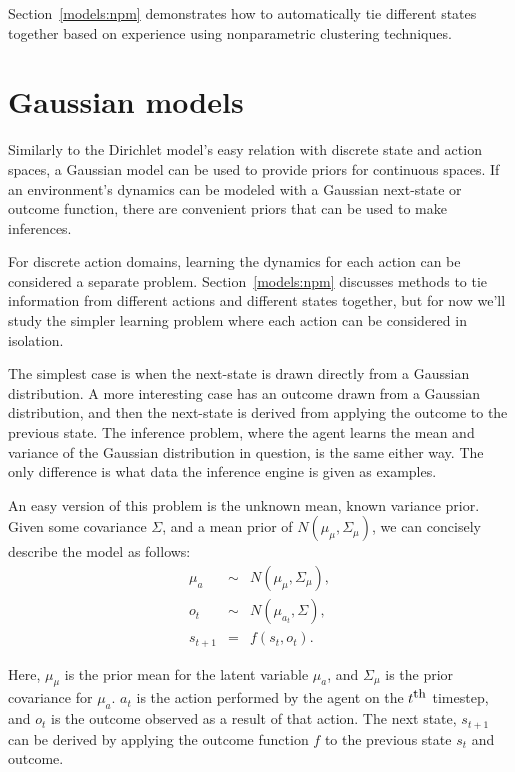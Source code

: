 Section~\ref{models:npm} demonstrates how to automatically tie different states together based on experience using nonparametric clustering techniques.

\section{Gaussian models}

Similarly to the Dirichlet model's easy relation with discrete state and action spaces, a Gaussian model can be used to provide priors for continuous spaces. If an environment's dynamics can be modeled with a Gaussian next-state or outcome function, there are convenient priors that can be used to make inferences.

 For discrete action domains, learning the dynamics for each action can be considered a separate problem. Section~\ref{models:npm} discusses methods to tie information from different actions and different states together, but for now we'll study the simpler learning problem where each action can be considered in isolation.

The simplest case is when the next-state is drawn directly from a Gaussian distribution. A more interesting case has an outcome drawn from a Gaussian distribution, and then the next-state is derived from applying the outcome to the previous state. The inference problem, where the agent learns the mean and variance of the Gaussian distribution in question, is the same either way. The only difference is what data the inference engine is given as examples.

An easy version of this problem is the unknown mean, known variance prior. Given some covariance $\Sigma$, and a mean prior of $N(\mu_\mu, \Sigma_\mu)$, we can concisely describe the model as follows:
\begin{eqnarray}
\mu_a &\sim& N(\mu_\mu, \Sigma_\mu),\\
o_t &\sim& N(\mu_{a_t}, \Sigma),\\
s_{t+1} &=& f(s_t, o_t).
\end{eqnarray}

Here, $\mu_\mu$ is the prior mean for the latent variable $\mu_a$, and $\Sigma_\mu$ is the prior covariance for $\mu_a$. $a_t$ is the action performed by the agent on the $t^{\mbox{\small th}}$ timestep, and $o_t$ is the outcome observed as a result of that action. The next state, $s_{t+1}$ can be derived by applying the outcome function $f$ to the previous state $s_t$ and outcome.

